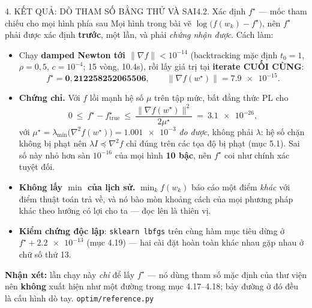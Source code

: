 \documentclass[aspectratio=169,11pt]{beamer}
\newcommand{\nx}{\textbf{Nhận xét:}}
\newcommand{\norm}[1]{\lVert #1 \rVert}
\begin{document}
\begin{frame}{4. KẾT QUẢ: DÒ THAM SỐ BẰNG THỬ VÀ SAI}{4.2. Xác định $f^\star$ --- mốc tham chiếu cho mọi hình phía sau}
  \scriptsize
  Mọi hình trong bài vẽ $\log\big(f(w_k)-f^\star\big)$, nên $f^\star$ phải được xác định
  \textbf{trước}, một lần, và phải \emph{chứng nhận được}. Cách làm:
  \begin{itemize}\scriptsize\itemsep=1pt
    \item Chạy \textbf{damped Newton tới $\norm{\nabla f}<10^{-14}$} (backtracking mặc định
          $t_0=1$, $\rho=0{,}5$, $c=10^{-4}$; 15 vòng, \num{10.4}s), rồi lấy giá trị tại
          \textbf{iterate CUỐI CÙNG}:
          \[ f^\star=\mathbf{0{,}212258252065506},\qquad \norm{\nabla f(w^\star)}=\num{7.9e-15}. \]
    \item \textbf{Chứng chỉ.} Với $f$ lồi mạnh hệ số $\mu$ trên tập mức, bất đẳng thức PL cho
          \[ 0\ \le\ f^\star-f_{\text{true}}^\star\ \le\ \frac{\norm{\nabla f(w^\star)}^2}{2\mu^\star}
             \ =\ \num{3.1e-26}, \]
          với $\mu^\star=\lambda_{\min}\big(\nabla^2f(w^\star)\big)=\num{1.001e-3}$ \emph{đo được},
          không phải $\lambda$: hệ số chặn không bị phạt nên $\lambda I\preceq\nabla^2f$ chỉ đúng
          trên các tọa độ bị phạt (mục 5.1). Sai số này nhỏ hơn sàn $10^{-16}$ của mọi hình
          \textbf{10 bậc}, nên $f^\star$ coi như chính xác tuyệt đối.
    \item \textbf{Không lấy $\min$ của lịch sử.} $\min_k f(w_k)$ báo cáo một điểm \emph{khác} với
          điểm thuật toán trả về, và nó bào mòn khoảng cách của mọi phương pháp khác theo hướng
          có lợi cho ta --- đọc lên là thiên vị.
    \item \textbf{Kiểm chứng độc lập}: \texttt{sklearn lbfgs} trên cùng hàm mục tiêu dừng ở
          $f^\star+\num{2.2e-13}$ (mục 4.19) --- hai cài đặt hoàn toàn khác nhau gặp nhau ở chữ số
          thứ 13.
  \end{itemize}
  \vspace{1pt}
  {\scriptsize\nx{} lần chạy này \emph{chỉ} để lấy $f^\star$ --- nó dùng tham số mặc định của thư
  viện nên \textbf{không} xuất hiện như một đường trong mục 4.17--4.18; bảy đường ở đó đều là
  cấu hình dò tay. \texttt{optim/reference.py}}
\end{frame}
\end{document}
